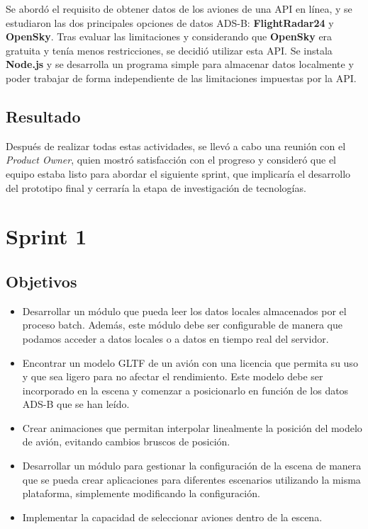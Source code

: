 \documentclass[a4paper, 11pt]{book}
\begin{document}
Se abordó el requisito de obtener datos de los aviones de una API en línea, y se estudiaron las dos principales opciones de datos ADS-B: \textbf{FlightRadar24} y \textbf{OpenSky}. Tras evaluar las limitaciones y considerando que \textbf{OpenSky} era gratuita y tenía menos restricciones, se decidió utilizar esta API.
Se instala \textbf{Node.js} y se desarrolla un programa simple para almacenar datos localmente y poder trabajar de forma independiente de las limitaciones impuestas por la API.
\subsection{Resultado}
Después de realizar todas estas actividades, se llevó a cabo una reunión con el \emph{Product Owner}, quien mostró satisfacción con el progreso y consideró que el equipo estaba listo para abordar el siguiente sprint, que implicaría el desarrollo del prototipo final y cerraría la etapa de investigación de tecnologías.
\section{Sprint 1}
\subsection{Objetivos}
\begin{itemize}
    \item Desarrollar un módulo que pueda leer los datos locales almacenados por el proceso batch. Además, este módulo debe ser configurable de manera que podamos acceder a datos locales o a datos en tiempo real del servidor.
    \item Encontrar un modelo GLTF de un avión con una licencia que permita su uso y que sea ligero para no afectar el rendimiento. Este modelo debe ser incorporado en la escena y comenzar a posicionarlo en función de los datos ADS-B que se han leído.
    \item Crear animaciones que permitan interpolar linealmente la posición del modelo de avión, evitando cambios bruscos de posición.
    \item Desarrollar un módulo para gestionar la configuración de la escena de manera que se pueda crear aplicaciones para diferentes escenarios utilizando la misma plataforma, simplemente modificando la configuración.
    \item Implementar la capacidad de seleccionar aviones dentro de la escena.
\end{itemize}
\end{document}
